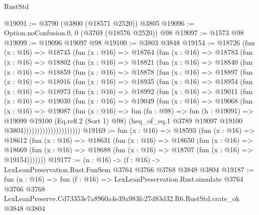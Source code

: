 \begin{lexlean}{RustStd}
\begin{coremodule}
@19091 := @3790 (@3800 (@18571 @2520)) @3805
@19096 := Option.noConfusion.{0, 0} (@3769 (@18576 @2520)) @98
@19097 := @1573 @98
@19099 := @19096 @19097 @98
@19100 := @3803 @3848
@19154 := @18726
    (fun (x : @16) =>
    @18745
      (fun (x : @16) =>
      @18764
        (fun (x : @16) =>
        @18783
          (fun (x : @16) =>
          @18802
            (fun (x : @16) =>
            @18821
              (fun (x : @16) =>
              @18840
                (fun (x : @16) =>
                @18859
                  (fun (x : @16) =>
                  @18878
                    (fun (x : @16) =>
                    @18897
                      (fun (x : @16) =>
                      @18916
                        (fun (x : @16) =>
                        @18935
                          (fun (x : @16) =>
                          @18954
                            (fun (x : @16) =>
                            @18973
                              (fun (x : @16) =>
                              @18992
                                (fun (x : @16) =>
                                @19011
                                  (fun (x : @16) =>
                                  @19030
                                    (fun (x : @16) =>
                                    @19049
                                      (fun (x : @16) =>
                                      @19068
                                        (fun (x : @16) =>
                                        @19087
                                          (fun (x : @16) =>
                                          fun (fn : @98) =>
                                          fun (h : @19091) =>
                                          @19099
                                            @19100
                                            (Eq.refl.{2} (Sort 1) @98)
                                            (heq_of_eq.{1}
                                              @3789
                                              @19097
                                              @19100
                                              @3804)))))))))))))))))))))
@19169 := fun (x : @16) =>
  @18593
    (fun (x : @16) =>
    @18612
      (fun (x : @16) =>
      @18631
        (fun (x : @16) =>
        @18650
          (fun (x : @16) =>
          @18669 (fun (x : @16) => @18688 (fun (x : @16) => @18707 (fun (x : @16) => @19154)))))))
@19177 := (n : @16) -> (f : @16) -> LexLeanPreservation.Rust.FunSem @3764 @3766 @3768 @3848 @3804
@19187 := fun (n : @16) =>
  fun (f : @16) =>
  LexLeanPreservation.Rust.simulate
    @3764
    @3766
    @3768
    LexLeanPreserve.Cd73353e7a8960a4e39a983fc27d83d32.R6.RustStd.crate_ok
    @3848
    @3804
\end{coremodule}
\end{lexlean}
